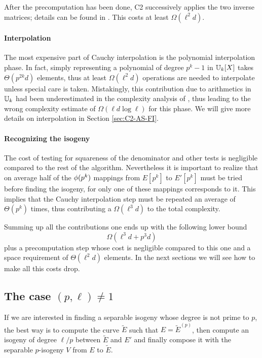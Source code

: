After the precomputation has been done, C2 successively applies the
two inverse matrices; details can be found in
\cite[$\S$2.4]{Cou96}. This costs at least $\Omega(\ell^2d)$.


\paragraph{Interpolation}
The most expensive part of Cauchy interpolation is the polynomial
interpolation phase. In fact, simply representing a polynomial of
degree $p^k-1$ in $\mathbb{U}_k[X]$ takes $\Theta(p^{2k}d)$ elements, thus at
least $\Omega(\ell^2d)$ operations are needed to interpolate unless
special care is taken. Mistakingly, this contribution due to
arithmetics in $\mathbb{U}_k$ had been underestimated in the complexity
analysis of \cite{Cou96}, thus leading to the wrong complexity
estimate of $\Omega(\ell d\log\ell)$ for this phase. We will give more
details on interpolation in Section \ref{sec:C2-AS-FI}.


\paragraph{Recognizing the isogeny}
The cost of testing for squareness of the denominator and other tests
is negligible compared to the rest of the algorithm. Nevertheless it
is important to realize that on average half of the $\phi(p^k)$
mappings from $E[p^k]$ to $E'[p^k]$ must be tried before finding the
isogeny, for only one of these mappings corresponds to it. This
implies that the Cauchy interpolation step must be repeated an average
of $\Theta(p^k)$ times, thus contributing a $\Omega(\ell^3d)$ to the
total complexity.

Summing up all the contributions one ends up with the following lower
bound
\begin{equation}
  \label{eq:C2:complexity}
  \Omega(\ell^3d + p^3d)
\end{equation}
plus a precomputation step whose cost is negligible compared to this
one and a space requirement of $\Theta(\ell^2d)$ elements. In the next
sections we will see how to make all this costs drop.


\subsection{The case $(p,\ell)\ne1$}
\label{sec:C2:non-prime}
If we are interested in finding a separable isogeny whose degree is
not prime to $p$, the best way is to compute the curve $\widetilde{E}$
such that $E = \widetilde{E}^{(p)}$, then compute an isogeny of degree
$\ell/p$ between $\widetilde{E}$ and $E'$ and finally compose it with
the separable $p$-isogeny $V$ from $E$ to $\widetilde{E}$.

